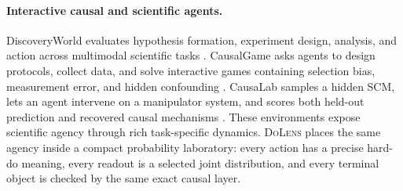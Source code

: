 \documentclass{article}
\newcommand{\method}{\textsc{DoLens}}
\begin{document}
\paragraph{Interactive causal and scientific agents.}
DiscoveryWorld evaluates hypothesis formation, experiment design, analysis, and
action across multimodal scientific tasks \citep{jansen2024discoveryworld}.
CausalGame asks agents to design protocols, collect data, and solve interactive
games containing selection bias, measurement error, and hidden confounding
\citep{chen2026causalgame}. CausaLab samples a hidden SCM, lets an agent
intervene on a manipulator system, and scores both held-out prediction and
recovered causal mechanisms \citep{yang2026causalab}. These environments expose
scientific agency through rich task-specific dynamics. \method{} places the same
agency inside a compact probability laboratory: every action has a precise
hard-do meaning, every readout is a selected joint distribution, and every
terminal object is checked by the same exact causal layer.
\end{document}
